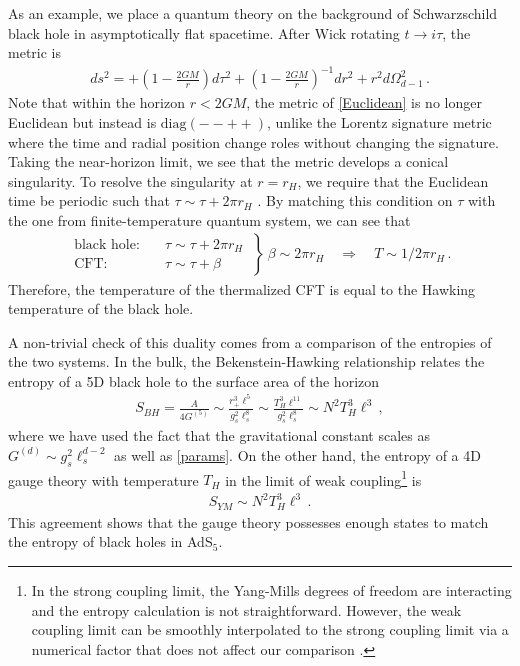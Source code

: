 \documentclass[../PhD.tex]{subfiles}
\begin{document}
As an example, we place a quantum theory on the background of Schwarzschild black hole in asymptotically flat spacetime. After Wick rotating $t \to i\tau$, the metric is
\begin{align}
\label{Euclidean}
ds^2 = +\left(1 - \frac{2GM}{r} \right) d\tau^2 + \left(1 - \frac{2GM}{r}\right)^{-1}dr^2 + r^2 d\Omega_{d-1}^2 \, .
\end{align}
Note that within the horizon $r < 2GM$, the metric of \eqref{Euclidean} is no longer Euclidean but instead is $\text{diag}(- - + +)$, unlike the Lorentz signature metric where the time and radial position change roles without changing the signature. Taking the near-horizon limit, we see that the metric develops a conical singularity. To resolve the singularity at $r=r_H$, we require that the Euclidean time be periodic such that $\tau \sim \tau + 2\pi r_H$ \cite{hep-th/9803131}. By matching this condition on $\tau$ with the one from finite-temperature quantum system, we can see that 
\begin{align}
\label{temp/grav}
\left. \begin{aligned}
	\text{black hole:} &\quad \tau \sim \tau + 2\pi r_H \\
	\text{CFT:} &\quad \tau \sim \tau + \beta
	\end{aligned}
\: \right\} \: \beta \sim 2\pi r_H \quad \Rightarrow \quad T \sim 1/ 2\pi r_H \, .
\end{align}
Therefore, the temperature of the thermalized CFT is equal to the Hawking temperature of the black hole.

A non-trivial check of this duality comes from a comparison of the entropies of the two systems. In the bulk, the Bekenstein-Hawking relationship relates the entropy of a 5D black hole to the surface area of the horizon \cite{Bekenstein:1973ur}
\begin{align}
\label{bh dual entropy}
S_{BH} = \frac{A}{4G^{(5)}} \sim \frac{r_+^3 \ell^5}{g_s^2 \ell_s^8} \sim \frac{T_H^3 \ell^{11}}{g_s^2 \ell_s^8} \sim N^2 T_H^3 \ell^3 \, ,
\end{align}
where we have used the fact that the gravitational constant scales as $G^{(d)} \sim g_s^2 \ell_s^{d-2}$ as well as \eqref{params}. On the other hand, the entropy of a 4D gauge theory with temperature $T_H$ in the limit of weak coupling\footnote{In the strong coupling limit, the Yang-Mills degrees of freedom are interacting and the entropy calculation is not straightforward. However, the weak coupling limit can be smoothly interpolated to the strong coupling limit via a numerical factor that does not affect our comparison \cite{gr-qc/0602037}.} is \cite{gr-qc/0602037}
\begin{align}
\label{gauge dual entropy}
S_{YM} \sim N^2 T_H^3 \ell^3 \, .
\end{align}
This agreement shows that the gauge theory possesses enough states to match the entropy of black holes in AdS$_5$.
\end{document}
